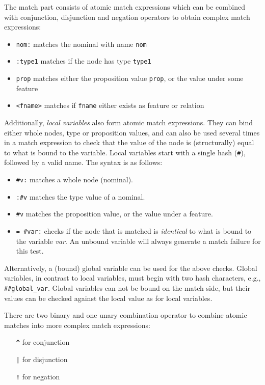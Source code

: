 \documentclass[11pt,a4paper]{article}
\newcommand{\cd}[1]{\texttt{#1}}
\begin{document}
The match part consists of atomic match expressions which can be combined with
conjunction, disjunction and negation operators to obtain complex match
expressions:

\begin{itemize}
\item \cd{nom:} matches the nominal with name \cd{nom}
\item \cd{:type1} matches if the node has type \cd{type1}
\item \cd{prop} matches either the proposition value \cd{prop}, or the value
  under some feature
\item \cd{<fname>} matches if \cd{fname} either exists as feature or
  relation
\end{itemize}

Additionally, \emph{local variables} also form atomic match expressions. They
can bind either whole nodes, type or proposition values, and can also be used
several times in a match expression to check that the value of the node is
(structurally) equal to what is bound to the variable. Local variables start
with a single hash (\cd{\#}), followed by a valid name. The syntax is as
follows:

\begin{itemize}
\item \cd{\#v:} matches a whole node (nominal).
\item \cd{:\#v} matches the type value of a nominal.
\item \cd{\#v} matches the proposition value, or the value under a feature.
\item \cd{= \#var:} checks if the node that is matched is \emph{identical} to
  what is bound to the variable \emph{var}. An unbound variable will always
  generate a match failure for this test.
\end{itemize}

Alternatively, a (bound) global variable can be used for the above checks.
Global variables, in contrast to local variables, must begin with two hash
characters, e.g., \texttt{\#\#global\_var}. Global variables can not be bound
on the match side, but their values can be checked against the local value as
for local variables.

There are two binary and one unary combination operator to combine atomic
matches into more complex match expressions:

\begin{itemize}\addtolength{\itemsep}{-.5\itemsep}
\item[\textbf{\cd{\^}}] for conjunction
\item[\textbf{\cd{|}}] for disjunction
\item[\textbf{\cd{!}}] for negation
\end{itemize}
\end{document}
